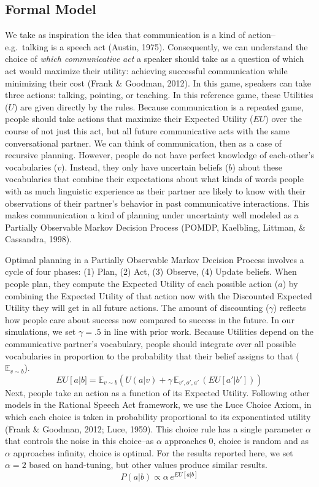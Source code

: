 \documentclass[english,,man,floatsintext]{apa6}
\begin{document}
\hypertarget{formal-model}{%
\subsection{Formal Model}\label{formal-model}}

We take as inspiration the idea that communication is a kind of action--e.g.~talking is a speech act (Austin, 1975). Consequently, we can understand the choice of \emph{which communicative act} a speaker should take as a question of which act would maximize their utility: achieving successful communication while minimizing their cost (Frank \& Goodman, 2012). In this game, speakers can take three actions: talking, pointing, or teaching. In this reference game, these Utilities (\(U\)) are given directly by the rules. Because communication is a repeated game, people should take actions that maximize their Expected Utility (\(EU\)) over the course of not just this act, but all future communicative acts with the same conversational partner. We can think of communication, then as a case of recursive planning. However, people do not have perfect knowledge of each-other's vocabularies (\(v\)). Instead, they only have uncertain beliefs (\(b\)) about these vocabularies that combine their expectations about what kinds of words people with as much linguistic experience as their partner are likely to know with their observations of their partner's behavior in past communicative interactions. This makes communication a kind of planning under uncertainty well modeled as a Partially Observable Markov Decision Process (POMDP, Kaelbling, Littman, \& Cassandra, 1998).

Optimal planning in a Partially Observable Markov Decision Process involves a cycle of four phases: (1) Plan, (2) Act, (3) Observe, (4) Update beliefs. When people plan, they compute the Expected Utility of each possible action (\(a\)) by combining the Expected Utility of that action now with the Discounted Expected Utility they will get in all future actions. The amount of discounting (\(\gamma\)) reflects how people care about success now compared to success in the future. In our simulations, we set \(\gamma=.5\) in line with prior work. Because Utilities depend on the communicative partner's vocabulary, people should integrate over all possible vocabularies in proportion to the probability that their belief assigns to that (\(\mathbb{E}_{v \sim b}\)).
\[
EU\left[a\right | b] = \mathbb{E}_{v \sim b} \left(U(a|v) + \gamma \,\mathbb{E}_{v',o',a'} \,\left( EU\left[a' | b'\right]\right)\right)
\]
Next, people take an action as a function of its Expected Utility. Following other models in the Rational Speech Act framework, we use the Luce Choice Axiom, in which each choice is taken in probability proportional to its exponentiated utility (Frank \& Goodman, 2012; Luce, 1959). This choice rule has a single parameter \(\alpha\) that controls the noise in this choice--as \(\alpha\) approaches 0, choice is random and as \(\alpha\) approaches infinity, choice is optimal. For the results reported here, we set \(\alpha = 2\) based on hand-tuning, but other values produce similar results.
\[
P\left(a|b\right) \propto \alpha \, e^{EU[a|b]}
\]
\end{document}
